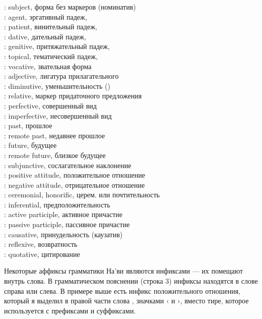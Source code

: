 \begin{multicols}{2}
\noindent{}: subject, форма без маркеров (номинатив) \\
: agent, эргативный падеж,  \\
: patient, винительный падеж,  \\
: dative, дательный падеж,  \\
: genitive, притяжательный падеж,  \\
: topical, тематический падеж,  \\
: vocative, звательная форма  \\
: adjective, лигатура прилагательного  \\
: diminutive, уменьшительность () \\
: relative, маркер придаточного предложения  \\
: perfective, совершенный вид \\
: imperfective, несовершенный вид \\
: past, прошлое \\
: remote past, недавнее прошлое \\
: future, будущее \\
: remote future, близкое будущее \\
: subjunctive, сослагательное наклонение \\
: positive attitude, положительное отношение \\
: negative attitude, отрицательное отношение \\
: ceremonial, honorific, церем. или почтительность \\
: inferential, предположительность \\
: active participle, активное причастие \\
: passive participle, пассивное причастие \\
: causative, принудельность (каузатив) \\
: reflexive, возвратность \\
: quotative, цитирование 
\end{multicols}

\noindent Некоторые аффиксы грамматики На'ви являются инфиксами
— их помещают внутрь слова. В грамматическом пояснении
(строка 3) инфиксы находятся в слове справа или слева. В примере
выше есть инфикс положительного отношения, который я выделил в
правой части слова , значками ‹
и ›, вместо тире, которое используется с префиксами и
суффиксами.

